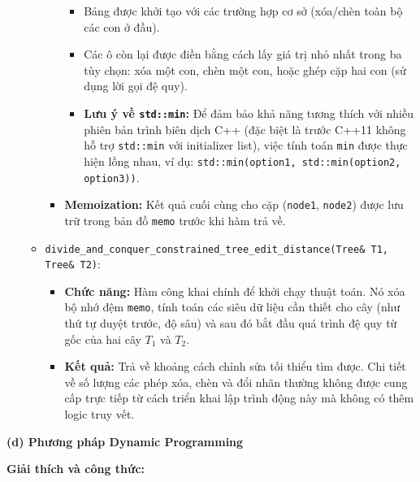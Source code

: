 \documentclass{article}
\begin{document}
\begin{itemize}
\begin{itemize}
\begin{itemize}
\begin{itemize}
                        \item Bảng được khởi tạo với các trường hợp cơ sở (xóa/chèn toàn bộ các con ở đầu).
                        \item Các ô còn lại được điền bằng cách lấy giá trị nhỏ nhất trong ba tùy chọn: xóa một con, chèn một con, hoặc ghép cặp hai con (sử dụng lời gọi đệ quy).
                        \item \textbf{Lưu ý về \texttt{std::min}:} Để đảm bảo khả năng tương thích với nhiều phiên bản trình biên dịch C++ (đặc biệt là trước C++11 không hỗ trợ \texttt{std::min} với initializer list), việc tính toán \texttt{min} được thực hiện lồng nhau, ví dụ: \texttt{std::min(option1, std::min(option2, option3))}.
                    \end{itemize}
                \item \textbf{Memoization:} Kết quả cuối cùng cho cặp (\texttt{node1}, \texttt{node2}) được lưu trữ trong bản đồ \texttt{memo} trước khi hàm trả về.
            \end{itemize}
        \item \texttt{divide\_and\_conquer\_constrained\_tree\_edit\_distance(Tree\& T1, Tree\& T2)}:
            \begin{itemize}
                \item \textbf{Chức năng:} Hàm công khai chính để khởi chạy thuật toán. Nó xóa bộ nhớ đệm \texttt{memo}, tính toán các siêu dữ liệu cần thiết cho cây (như thứ tự duyệt trước, độ sâu) và sau đó bắt đầu quá trình đệ quy từ gốc của hai cây $T_1$ và $T_2$.
                \item \textbf{Kết quả:} Trả về khoảng cách chỉnh sửa tối thiểu tìm được. Chi tiết về số lượng các phép xóa, chèn và đổi nhãn thường không được cung cấp trực tiếp từ cách triển khai lập trình động này mà không có thêm logic truy vết.
            \end{itemize}
    \end{itemize}
\end{itemize}

\textbf{(d) Phương pháp Dynamic Programming}

\textbf{Giải thích và công thức:}
\end{document}

